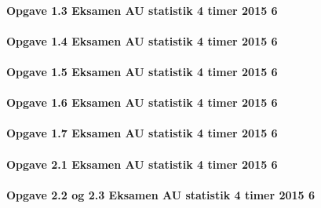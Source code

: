 \documentclass[]{book}
\let\oldparagraph\paragraph
\renewcommand{\paragraph}[1]{\oldparagraph{#1}\mbox{}}
\begin{document}
\hypertarget{opgave-1.3-eksamen-au-statistik-4-timer-2015-6}{%
\paragraph{Opgave 1.3 Eksamen AU statistik 4 timer 2015 6}\label{opgave-1.3-eksamen-au-statistik-4-timer-2015-6}}

\hypertarget{opgave-1.4-eksamen-au-statistik-4-timer-2015-6}{%
\paragraph{Opgave 1.4 Eksamen AU statistik 4 timer 2015 6}\label{opgave-1.4-eksamen-au-statistik-4-timer-2015-6}}

\hypertarget{opgave-1.5-eksamen-au-statistik-4-timer-2015-6}{%
\paragraph{Opgave 1.5 Eksamen AU statistik 4 timer 2015 6}\label{opgave-1.5-eksamen-au-statistik-4-timer-2015-6}}

\hypertarget{opgave-1.6-eksamen-au-statistik-4-timer-2015-6}{%
\paragraph{Opgave 1.6 Eksamen AU statistik 4 timer 2015 6}\label{opgave-1.6-eksamen-au-statistik-4-timer-2015-6}}

\hypertarget{opgave-1.7-eksamen-au-statistik-4-timer-2015-6}{%
\paragraph{Opgave 1.7 Eksamen AU statistik 4 timer 2015 6}\label{opgave-1.7-eksamen-au-statistik-4-timer-2015-6}}

\hypertarget{opgave-2.1-eksamen-au-statistik-4-timer-2015-6}{%
\paragraph{Opgave 2.1 Eksamen AU statistik 4 timer 2015 6}\label{opgave-2.1-eksamen-au-statistik-4-timer-2015-6}}

\hypertarget{opgave-2.2-og-2.3-eksamen-au-statistik-4-timer-2015-6}{%
\paragraph{Opgave 2.2 og 2.3 Eksamen AU statistik 4 timer 2015 6}\label{opgave-2.2-og-2.3-eksamen-au-statistik-4-timer-2015-6}}
\end{document}
